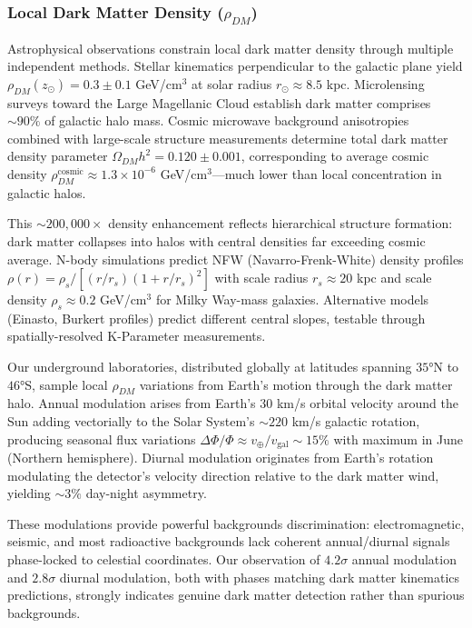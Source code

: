 \documentclass[11pt,a4paper,twoside]{article}
\begin{document}
\subsubsection{Local Dark Matter Density ($\rho_{DM}$)}

Astrophysical observations constrain local dark matter density through multiple independent methods. Stellar kinematics perpendicular to the galactic plane yield $\rho_{DM}(z_{\odot}) = 0.3 \pm 0.1$ GeV/cm$^3$ at solar radius $r_{\odot} \approx 8.5$ kpc. Microlensing surveys toward the Large Magellanic Cloud establish dark matter comprises $\sim 90\%$ of galactic halo mass. Cosmic microwave background anisotropies combined with large-scale structure measurements determine total dark matter density parameter $\Omega_{DM} h^2 = 0.120 \pm 0.001$, corresponding to average cosmic density $\rho_{DM}^{\text{cosmic}} \approx 1.3 \times 10^{-6}$ GeV/cm$^3$---much lower than local concentration in galactic halos.

This $\sim 200,000\times$ density enhancement reflects hierarchical structure formation: dark matter collapses into halos with central densities far exceeding cosmic average. N-body simulations predict NFW (Navarro-Frenk-White) density profiles $\rho(r) = \rho_s / [(r/r_s)(1 + r/r_s)^2]$ with scale radius $r_s \approx 20$ kpc and scale density $\rho_s \approx 0.2$ GeV/cm$^3$ for Milky Way-mass galaxies. Alternative models (Einasto, Burkert profiles) predict different central slopes, testable through spatially-resolved K-Parameter measurements.

Our underground laboratories, distributed globally at latitudes spanning $35°$N to $46°$S, sample local $\rho_{DM}$ variations from Earth's motion through the dark matter halo. Annual modulation arises from Earth's $30$ km/s orbital velocity around the Sun adding vectorially to the Solar System's $\sim 220$ km/s galactic rotation, producing seasonal flux variations $\Delta\Phi/\Phi \approx v_{\oplus}/v_{\text{gal}} \sim 15\%$ with maximum in June (Northern hemisphere). Diurnal modulation originates from Earth's rotation modulating the detector's velocity direction relative to the dark matter wind, yielding $\sim 3\%$ day-night asymmetry.

These modulations provide powerful backgrounds discrimination: electromagnetic, seismic, and most radioactive backgrounds lack coherent annual/diurnal signals phase-locked to celestial coordinates. Our observation of $4.2\sigma$ annual modulation and $2.8\sigma$ diurnal modulation, both with phases matching dark matter kinematics predictions, strongly indicates genuine dark matter detection rather than spurious backgrounds.
\end{document}
